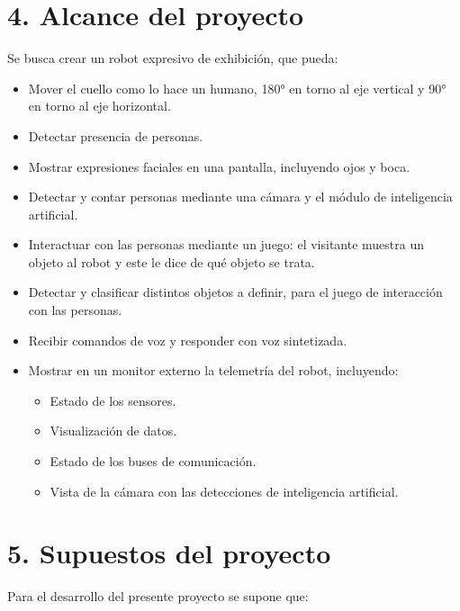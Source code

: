 \documentclass[
11pt, %
]{charter}
\begin{document}
\section{4. Alcance del proyecto}
\label{sec:alcance}

Se busca crear un robot expresivo de exhibición, que pueda:

\begin{itemize}
	\item Mover el cuello como lo hace un humano, 180° en torno al eje vertical y 90° en torno al eje horizontal.
	\item Detectar presencia de personas.
	\item Mostrar expresiones faciales en una pantalla, incluyendo ojos y boca. 
	\item Detectar y contar personas mediante una cámara y el módulo de inteligencia artificial.
	\item Interactuar con las personas mediante un juego: el visitante muestra un objeto al robot y este le dice de qué objeto se trata.
	\item Detectar y clasificar distintos objetos a definir, para el juego de interacción con las personas.
	\item Recibir comandos de voz y responder con voz sintetizada.
	\item Mostrar en un monitor externo la telemetría del robot, incluyendo:
		\begin{itemize}
		\item Estado de los sensores.
		\item Visualización de datos.
		\item Estado de los buses de comunicación.
		\item Vista de la cámara con las detecciones de inteligencia artificial.
		\end{itemize}
\end{itemize}

\section{5. Supuestos del proyecto}
\label{sec:supuestos}

Para el desarrollo del presente proyecto se supone que: 
\end{document}
